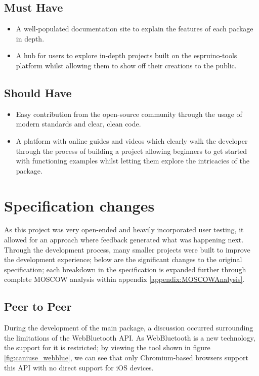 \documentclass{l4proj}
\begin{document}
\subsection{Must Have}
\begin{itemize}
    \item A well-populated documentation site to explain the features of each package in depth.
    \item A hub for users to explore in-depth projects built on the espruino-tools platform whilst allowing them to show off their creations to the public.
    
\end{itemize} 
\subsection{Should Have}
\begin{itemize}
    \item Easy contribution from the open-source community through the usage of modern standards and clear, clean code.
    \item A platform with online guides and videos which clearly walk the developer through the process of building a project allowing beginners to get started with functioning examples whilst letting them explore the intricacies of the package.
\end{itemize} 

\section{Specification changes}

\text As this project was very open-ended and heavily incorporated user testing, it allowed for an approach where feedback generated what was happening next. Through the development process, many smaller projects were built to improve the development experience; below are the significant changes to the original specification; each breakdown in the specification is expanded further through complete MOSCOW analysis within appendix \ref{appendix:MOSCOWAnalysis}.

\subsection{Peer to Peer}
\text During the development of the main package, a discussion occurred surrounding the limitations of the WebBluetooth API. As WebBluetooth is a new technology, the support for it is restricted; by viewing the \cite{caniuse} tool shown in figure \ref{fig:caniuse_webblue}, we can see that only Chromium-based browsers support this API with no direct support for iOS devices.
\end{document}
